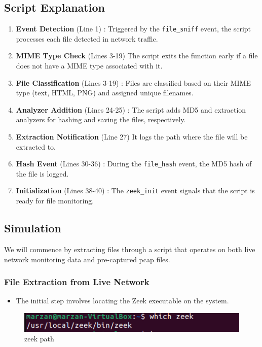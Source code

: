 \subsection{Script Explanation}
\begin{enumerate}
    \item \textbf{Event Detection} (Line 1) : Triggered by the \texttt{file\_sniff} event, the script processes each file detected in network traffic.
    \item \textbf{MIME Type Check} (Lines 3-19) The script exits the function early if a file does not have a MIME type associated with it.
    \item \textbf{File Classification} (Lines 3-19) : Files are classified based on their MIME type (text, HTML, PNG) and assigned unique filenames.
    \item \textbf{Analyzer Addition} (Lines 24-25) : The script adds MD5 and extraction analyzers for hashing and saving the files, respectively.
    \item \textbf{Extraction Notification} (Line 27) It logs the path where the file will be extracted to.
    \item \textbf{Hash Event} (Lines 30-36) : During the \texttt{file\_hash} event, the MD5 hash of the file is logged.
    \item \textbf{Initialization} (Lines 38-40) : The \texttt{zeek\_init} event signals that the script is ready for file monitoring.
\end{enumerate}

\subsection{Simulation}

We will commence by extracting files through a script that operates on both live network monitoring data and pre-captured pcap files.
\subsubsection{File Extraction from Live Network}
    \begin{itemize}
    \item The initial step involves locating the Zeek executable on the system.
    \end{itemize}
    \begin{figure}[H]
    \centering
    \includegraphics[width=1\linewidth]{images/which_zeek.png}
    \caption{zeek path}
    \label{fig:enter-label}
\end{figure}

